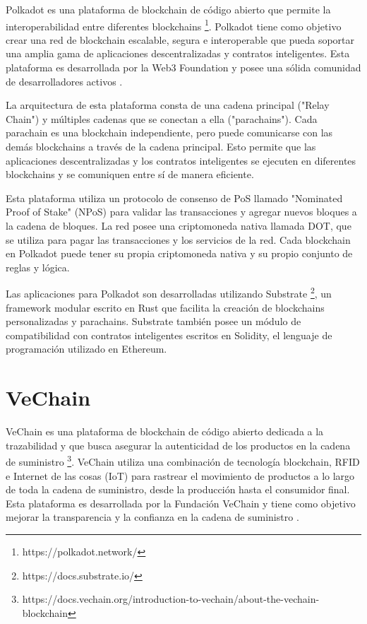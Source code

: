 \documentclass{article}
\begin{document}
Polkadot es una plataforma de blockchain de código abierto que permite la interoperabilidad entre diferentes blockchains \footnote{https://polkadot.network/}. Polkadot tiene como objetivo crear una red de blockchain escalable, segura e interoperable que pueda soportar una amplia gama de aplicaciones descentralizadas y contratos inteligentes. Esta plataforma es desarrollada por la Web3 Foundation y posee una sólida comunidad de desarrolladores activos \cite{wood2016polkadot}.

La arquitectura de esta plataforma consta de una cadena principal ("Relay Chain") y múltiples cadenas que se conectan a ella ("parachains"). Cada parachain es una blockchain independiente, pero puede comunicarse con las demás blockchains a través de la cadena principal. Esto permite que las aplicaciones descentralizadas y los contratos inteligentes se ejecuten en diferentes blockchains y se comuniquen entre sí de manera eficiente. 

Esta plataforma utiliza un protocolo de consenso de PoS llamado "Nominated Proof of Stake" (NPoS) para validar las transacciones y agregar nuevos bloques a la cadena de bloques. La red posee una criptomoneda nativa llamada DOT, que se utiliza para pagar las transacciones y los servicios de la red. Cada blockchain en Polkadot puede tener su propia criptomoneda nativa y su propio conjunto de reglas y lógica.

Las aplicaciones para Polkadot son desarrolladas utilizando Substrate \footnote{https://docs.substrate.io/}, un framework modular escrito en Rust que facilita la creación de blockchains personalizadas y parachains. Substrate también posee un módulo de compatibilidad con contratos inteligentes escritos en Solidity, el lenguaje de programación utilizado en Ethereum.

\section{VeChain}

VeChain es una plataforma de blockchain de código abierto dedicada a la trazabilidad y que busca asegurar la autenticidad de los productos en la cadena de suministro \footnote{https://docs.vechain.org/introduction-to-vechain/about-the-vechain-blockchain}. VeChain utiliza una combinación de tecnología blockchain, RFID e Internet de las cosas (IoT) para rastrear el movimiento de productos a lo largo de toda la cadena de suministro, desde la producción hasta el consumidor final. Esta plataforma es desarrollada por la Fundación VeChain y tiene como objetivo mejorar la transparencia y la confianza en la cadena de suministro \cite{she2022vechain}.
\end{document}
